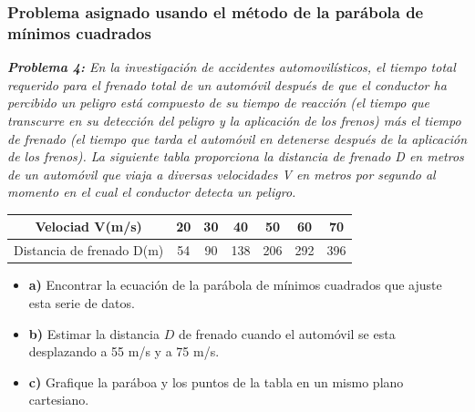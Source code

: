 \documentclass[11pt,letterpaper]{article}
\begin{document}
\subsubsection*{\textcolor{Mahogany}{Problema asignado usando el método de la parábola de mínimos cuadrados}}
\begin{center}
	\textit{\textbf{Problema 4:} En la investigación de accidentes automovilísticos, el tiempo total requerido para el frenado total de un automóvil después de que el conductor ha percibido un peligro está compuesto de su tiempo de reacción (el tiempo que transcurre en su detección del peligro y la aplicación de los frenos) más el tiempo de frenado (el tiempo que tarda el automóvil en detenerse después de la aplicación de los frenos). La siguiente tabla proporciona la distancia de frenado D en metros de un automóvil que viaja a diversas velocidades V en metros por segundo al momento en el cual el conductor detecta un peligro.}
	\linebreak\par
	\begin{tabular}{c| c c c c c c }
	\hline
		Velociad V(m/s) &   20 & 30 & 40 & 50 & 60 & 70 \\ 		\hline
		Distancia de frenado D(m) & 54 & 90 & 138 & 206 & 292 & 396 \\
		\hline
	\end{tabular}
	\begin{itemize}
		\item \textbf{a)} Encontrar la ecuación de la parábola de mínimos cuadrados que ajuste esta serie de datos.
		\item \textbf{b)} Estimar la distancia $D$ de frenado cuando el automóvil se esta desplazando a 55 m/s y a 75 m/s.
		\item \textbf{c)} Grafique la paráboa y los puntos de la tabla en un mismo plano cartesiano.
	\end{itemize}
\end{center}
\end{document}
